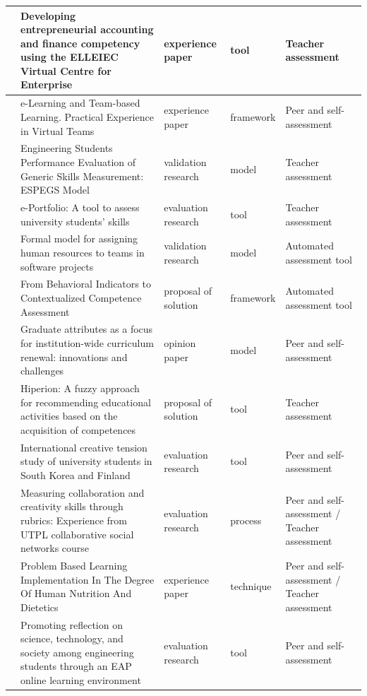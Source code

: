 \begin{landscape}
\begin{center}
\begin{longtable}{| c | m{9cm} | m{4cm} | m{2.5cm} | m{3.5cm} |}
    \hline
    \cite{ward2011developing} & Developing entrepreneurial accounting and finance competency using the ELLEIEC Virtual Centre for Enterprise & experience paper & tool & Teacher assessment \\
    \hline
    \cite{ficapal2015learning} & e-Learning and Team-based Learning. Practical Experience in Virtual Teams & experience paper & framework & Peer and self-assessment \\
    \hline
    \cite{rashid2008engineering} & Engineering Students Performance Evaluation of Generic Skills Measurement: ESPEGS Model & validation research & model & Teacher assessment \\
    \hline
    \cite{rodriguez2010portfolio} & e-Portfolio: A tool to assess university students' skills & evaluation research & tool & Teacher assessment \\
    \hline
    \cite{andre2011formal} & Formal model for assigning human resources to teams in software projects & validation research & model & Automated assessment tool \\
    \hline
    \cite{bedek2011behavioral} & From Behavioral Indicators to Contextualized Competence Assessment & proposal of solution & framework & Automated assessment tool \\
    \hline
    \cite{oliver2013graduate} & Graduate attributes as a focus for institution-wide curriculum renewal: innovations and challenges & opinion paper & model & Peer and self-assessment \\
    \hline
    \cite{serrano2013hiperion} & Hiperion: A fuzzy approach for recommending educational activities based on the acquisition of competences & proposal of solution & tool & Teacher assessment \\
    \hline
    \cite{chang2009international} & International creative tension study of university students in South Korea and Finland & evaluation research & tool & Peer and self-assessment \\
    \hline
    \cite{piedra2010measuring} & Measuring collaboration and creativity skills through rubrics: Experience from UTPL collaborative social networks course & evaluation research & process & Peer and self-assessment / Teacher assessment \\
    \hline
    \cite{lasa2013problem} & Problem Based Learning Implementation In The Degree Of Human Nutrition And Dietetics & experience paper & technique & Peer and self-assessment / Teacher assessment \\
    \hline
    \cite{arno2011promoting} & Promoting reflection on science, technology, and society among engineering students through an EAP online learning environment & evaluation research & tool & Peer and self-assessment \\

\end{longtable}
\end{center}
\end{landscape}
